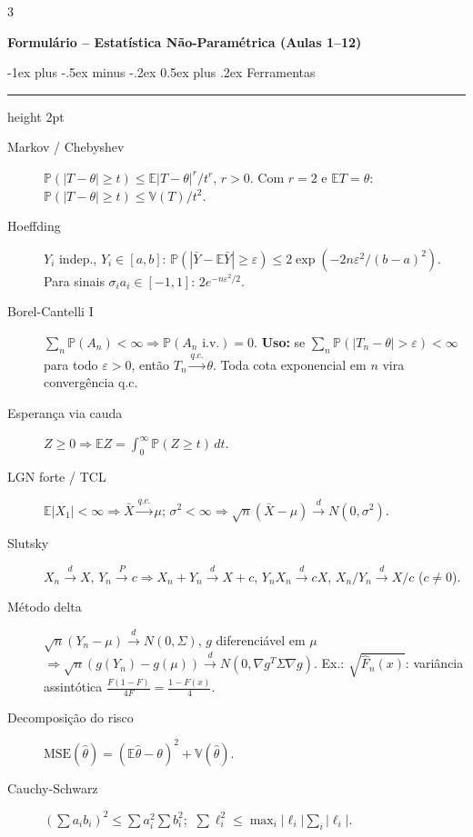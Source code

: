 \documentclass[10pt,landscape]{article}
\makeatletter
\newcommand{\E}{\mathbb{E}}
\newcommand{\V}{\mathbb{V}}
\renewcommand{\P}{\mathbb{P}}
\newcommand{\MSE}{\textrm{MSE}}
\newcommand{\Fn}{\hat{F}_n}
\newcommand{\qc}{\xrightarrow{q.c.}}
\newcommand{\dto}{\xrightarrow{d}}
\newcommand{\pto}{\xrightarrow{P}}
\renewcommand{\section}{\@startsection{section}{1}{0mm}%
                                {-1ex plus -.5ex minus -.2ex}%
                                {0.5ex plus .2ex}%
                                {\normalfont\small\bfseries}}
\newcommand{\secrule}{\smallskip \hrule height 2pt \smallskip}
\makeatother
\begin{document}
\raggedright
\scriptsize
\begin{multicols}{3}
\setlength{\premulticols}{1pt}
\setlength{\postmulticols}{1pt}
\setlength{\multicolsep}{1pt}
\setlength{\columnsep}{2pt}

{\normalsize\bfseries Formulário -- Estatística Não-Paramétrica (Aulas 1--12)}\par
\smallskip

\section{Ferramentas}\secrule
\begin{description}
  \item[Markov / Chebyshev] $\P(|T-\theta|\ge t)\le \E|T-\theta|^r/t^r$, $r>0$. Com $r=2$ e $\E T=\theta$: $\P(|T-\theta|\ge t)\le \V(T)/t^2$.
  \item[Hoeffding] $Y_i$ indep., $Y_i\in[a,b]$: $\P(|\bar Y-\E\bar Y|\ge\varepsilon)\le 2\exp\!\left(-2n\varepsilon^2/(b-a)^2\right)$. Para sinais $\sigma_i a_i\in[-1,1]$: $2e^{-n\varepsilon^2/2}$.
  \item[Borel-Cantelli I] $\sum_n\P(A_n)<\infty\Rightarrow \P(A_n\text{ i.v.})=0$. \textbf{Uso:} se $\sum_n \P(|T_n-\theta|>\varepsilon)<\infty$ para todo $\varepsilon>0$, então $T_n\qc\theta$. Toda cota exponencial em $n$ vira convergência q.c.
  \item[Esperança via cauda] $Z\ge0\Rightarrow \E Z=\int_0^\infty \P(Z\ge t)\,dt$.
  \item[LGN forte / TCL] $\E|X_1|<\infty\Rightarrow\bar X\qc\mu$; $\sigma^2<\infty\Rightarrow\sqrt n(\bar X-\mu)\dto N(0,\sigma^2)$.
  \item[Slutsky] $X_n\dto X$, $Y_n\pto c\Rightarrow X_n+Y_n\dto X+c$, $Y_nX_n\dto cX$, $X_n/Y_n\dto X/c$ ($c\ne0$).
  \item[Método delta] $\sqrt n(Y_n-\mu)\dto N(0,\Sigma)$, $g$ diferenciável em $\mu$ $\Rightarrow \sqrt n(g(Y_n)-g(\mu))\dto N(0,\nabla g^T\Sigma\nabla g)$. Ex.: $\sqrt{\Fn(x)}$: variância assintótica $\frac{F(1-F)}{4F}=\frac{1-F(x)}{4}$.
  \item[Decomposição do risco] $\MSE(\hat\theta)=(\E\hat\theta-\theta)^2+\V(\hat\theta)$.
  \item[Cauchy-Schwarz] $\left(\sum a_ib_i\right)^2\le\sum a_i^2\sum b_i^2$; $\ \sum\ell_i^2\le \max_i|\ell_i|\sum_i|\ell_i|$.
\end{description}


\end{multicols}
\end{document}

